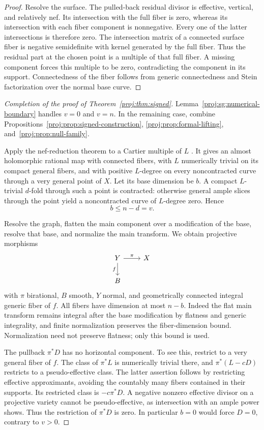 \documentclass[11pt,letterpaper]{article}
\theoremstyle{definition}
\theoremstyle{remark}
\begin{document}
\begin{proof}
Resolve the surface.  The pulled-back residual divisor
is effective, vertical, and relatively nef.  Its
intersection with the full fiber is zero, whereas its
intersection with each fiber component is nonnegative.
Every one of the latter intersections is therefore zero.
The intersection matrix of a connected surface fiber
is negative semidefinite with kernel generated by the
full fiber.  Thus the residual part at the chosen point
is a multiple of that full fiber.  A missing component
forces this multiple to be zero, contradicting the
component in its support.  Connectedness of the fiber
follows from generic connectedness and Stein
factorization over the normal base curve.
\end{proof}

\begin{proof}[Completion of the proof of Theorem~\ref{proj:thm:signed}]
Lemma~\ref{proj:sg:numerical-boundary} handles $v=0$ and $v=n$.
In the remaining case, combine
Propositions~\ref{proj:prop:signed-construction},
\ref{proj:prop:formal-lifting}, and~\ref{proj:prop:null-family}.

Apply the nef-reduction theorem to a Cartier multiple
of $L$ \cite[Theorem~2.1]{Proj-BauerEtAl2002}.  It gives an almost
holomorphic rational map with connected fibers, with
$L$ numerically trivial on its compact general fibers,
and with positive $L$-degree on every noncontracted
curve through a very general point of $X$.
Let its base dimension be $b$.  A compact $L$-trivial
$d$-fold through such a point is contracted: otherwise
general ample slices through the point yield a
noncontracted curve of $L$-degree zero.  Hence
\[
 b\le n-d=v.
\]

Resolve the graph, flatten the main component over a
modification of the base, resolve that base, and
normalize the main transform.  We obtain projective
morphisms
\[
 \begin{tikzcd}
 Y \arrow[r,"\pi"] \arrow[d,"f"'] & X\\
 B &
 \end{tikzcd}
\]
with $\pi$ birational, $B$ smooth, $Y$ normal, and
geometrically connected integral generic fiber of $f$.
All fibers have dimension at most $n-b$.
Indeed the flat main transform remains integral after
the base modification by flatness and generic
integrality, and finite normalization preserves the
fiber-dimension bound.  Normalization need not preserve
flatness; only this bound is used.

The pullback $\pi^*D$ has no horizontal component.
To see this, restrict to a very general fiber of $f$.
The class of $\pi^*L$ is numerically trivial there,
and $\pi^*(L-cD)$ restricts to a pseudo-effective class.
The latter assertion follows by restricting effective
approximants, avoiding the countably many fibers
contained in their supports.  Its restricted class is
$-c\pi^*D$.  A negative nonzero effective divisor on a
projective variety cannot be pseudo-effective, as
intersection with an ample power shows.  Thus the
restriction of $\pi^*D$ is zero.  In particular $b=0$
would force $D=0$, contrary to $v>0$.


\end{proof}
\end{document}
